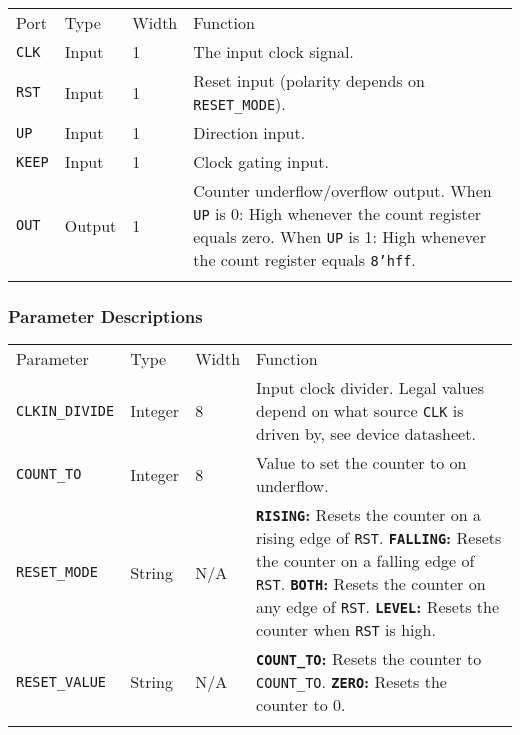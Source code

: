 \documentclass[11pt]{article}
\newcommand{\tokenstyle}[1]{\texttt{#1}}
\newcommand{\valuestyle}[1]{\texttt{#1}}
\newcommand{\strvaluestyle}[1]{\valuestyle{\textquotedbl#1\textquotedbl}}
\newcommand{\strexamplestyle}[1]{\textbf{\strvaluestyle{#1}:}}
\newcommand{\datastyle}[1]{\texttt{#1}}
\newcommand{\whenstyle}[1]{{\fontseries{sb}\selectfont#1}}
\newcommand{\thinhline}{\Xhline{1\arrayrulewidth}}
\newcommand{\thickhline}{\Xhline{2.5\arrayrulewidth}}
\begin{document}
\begin{tabularx}{\textwidth}{lllX}
\thinhline
\whenstyle{Port} & \whenstyle{Type} & \whenstyle{Width} & \whenstyle{Function} \\
\thickhline
\tokenstyle{CLK} & Input & 1 & The input clock signal. \\
\thinhline
\tokenstyle{RST} & Input & 1 & Reset input (polarity depends on \tokenstyle{RESET\_MODE}). \\
\thinhline
\tokenstyle{UP} & Input & 1 & Direction input. \\
\thinhline
\tokenstyle{KEEP} & Input & 1 & Clock gating input. \\
\thinhline
\tokenstyle{OUT} & Output & 1 & Counter underflow/overflow output. \newline
	\whenstyle{When \tokenstyle{UP} is 0:} High whenever the count register equals zero. \newline
	\whenstyle{When \tokenstyle{UP} is 1:} High whenever the count register equals \datastyle{8'hff}. \\
\thinhline
\end{tabularx}

\subsubsection{Parameter Descriptions}

\begin{tabularx}{\textwidth}{lllX}
\thinhline
\whenstyle{Parameter} & \whenstyle{Type} & \whenstyle{Width} & \whenstyle{Function} \\
\thickhline
\tokenstyle{CLKIN\_DIVIDE} & Integer & 8 &
	Input clock divider. Legal values depend on what source \tokenstyle{CLK} is driven by, see device datasheet.\\
\thinhline
\tokenstyle{COUNT\_TO} & Integer & 8 & Value to set the counter to on underflow. \\
\thinhline
\tokenstyle{RESET\_MODE} & String & N/A &
	\strexamplestyle{RISING} Resets the counter on a rising edge of \tokenstyle{RST}. \newline
	\strexamplestyle{FALLING} Resets the counter on a falling edge of \tokenstyle{RST}. \newline
	\strexamplestyle{BOTH} Resets the counter on any edge of \tokenstyle{RST}. \newline
	\strexamplestyle{LEVEL} Resets the counter when \tokenstyle{RST} is high. \\
\thinhline
\tokenstyle{RESET\_VALUE} & String & N/A &
	\strexamplestyle{COUNT\_TO} Resets the counter to \tokenstyle{COUNT\_TO}. \newline
	\strexamplestyle{ZERO} Resets the counter to 0. \\
\thinhline
\end{tabularx}
\end{document}
